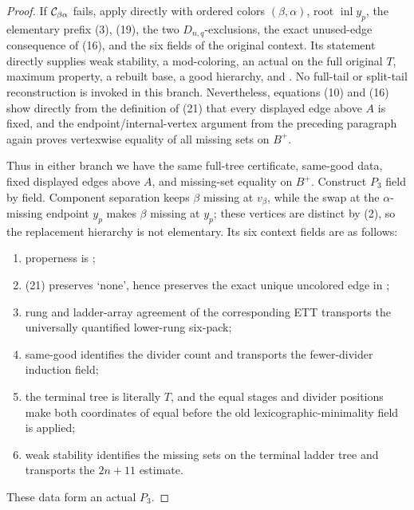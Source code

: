 \begin{proof}
If \({\cal C}_{\beta\alpha}\) fails, apply
 directly with ordered colors
\((\beta,\alpha)\), root \(\operatorname{inl}y_p\), the elementary
prefix (3), (19), the two \(D_{n,q}\)-exclusions, the exact unused-edge
consequence of (16), and the six fields of the original context.  Its
statement directly supplies weak stability, a mod-coloring, an actual
 on the full original
\(T\), maximum property, a rebuilt base, a good hierarchy, and
.  No full-tail or split-tail reconstruction
is invoked in this branch.  Nevertheless, equations (10) and (16) show
directly from the definition of (21) that every displayed edge above
\(A\) is fixed, and the endpoint/internal-vertex argument from the
preceding paragraph again proves vertexwise equality of all missing sets
on \(B^+\).

Thus in either branch we have the same full-tree certificate, same-good
data, fixed displayed edges above \(A\), and missing-set equality on
\(B^+\).  Construct \(P_3\) field by field.  Component separation keeps
\(\beta\) missing at \(v_\beta\), while the swap at the
\(\alpha\)-missing endpoint \(y_p\) makes \(\beta\) missing at \(y_p\);
these vertices are distinct by (2), so the replacement hierarchy is not
elementary.  Its six context fields are as follows:
\begin{enumerate}
\item properness is ;
\item (21) preserves `none', hence preserves the exact unique uncolored
      edge in ;
\item rung and ladder-array agreement of the corresponding ETT transports
      the universally quantified lower-rung six-pack;
\item same-good identifies the divider count and transports the
      fewer-divider induction field;
\item the terminal tree is literally \(T\), and the equal stages and
      divider positions make both coordinates of
       equal before the old
      lexicographic-minimality field is applied;
\item weak stability identifies the missing sets on the terminal ladder
      tree and transports the \(2n+11\) estimate.
\end{enumerate}
These data form an actual
 \(P_3\).


\end{proof}
